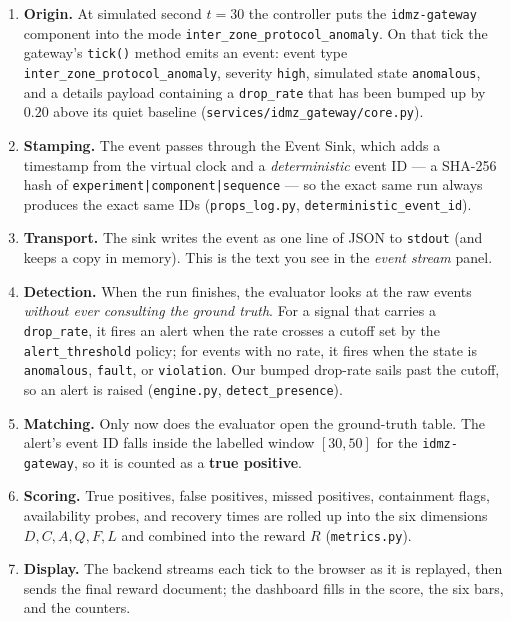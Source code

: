 \documentclass[11pt]{article}
\newcommand{\code}[1]{\texttt{\small #1}}
\newcommand{\file}[1]{\textcolor{mfpurple}{\texttt{\small #1}}}
\begin{document}
\begin{enumerate}[leftmargin=1.5em]
  \item \textbf{Origin.} At simulated second $t=30$ the controller puts the
        \code{idmz-gateway} component into the mode
        \code{inter\_zone\_protocol\_anomaly}. On that tick the gateway's
        \code{tick()} method emits an event: event type
        \code{inter\_zone\_protocol\_anomaly}, severity \code{high}, simulated
        state \code{anomalous}, and a details payload containing a
        \code{drop\_rate} that has been bumped up by $0.20$ above its quiet
        baseline (\file{services/idmz\_gateway/core.py}).
  \item \textbf{Stamping.} The event passes through the Event Sink, which adds a
        timestamp from the virtual clock and a \emph{deterministic} event ID ---
        a SHA-256 hash of \code{experiment|component|sequence} --- so the exact
        same run always produces the exact same IDs
        (\file{props\_log.py}, \code{deterministic\_event\_id}).
  \item \textbf{Transport.} The sink writes the event as one line of JSON to
        \code{stdout} (and keeps a copy in memory). This is the text you see in
        the \emph{event stream} panel.
  \item \textbf{Detection.} When the run finishes, the evaluator looks at the
        raw events \emph{without ever consulting the ground truth}. For a signal
        that carries a \code{drop\_rate}, it fires an alert when the rate crosses
        a cutoff set by the \code{alert\_threshold} policy; for events with no
        rate, it fires when the state is \code{anomalous}, \code{fault}, or
        \code{violation}. Our bumped drop-rate sails past the cutoff, so an alert
        is raised (\file{engine.py}, \code{detect\_presence}).
  \item \textbf{Matching.} Only now does the evaluator open the ground-truth
        table. The alert's event ID falls inside the labelled window
        $[30,50]$ for the \code{idmz-gateway}, so it is counted as a
        \textbf{true positive}.
  \item \textbf{Scoring.} True positives, false positives, missed positives,
        containment flags, availability probes, and recovery times are rolled up
        into the six dimensions $D, C, A, Q, F, L$ and combined into the reward
        $R$ (\file{metrics.py}).
  \item \textbf{Display.} The backend streams each tick to the browser as it is
        replayed, then sends the final reward document; the dashboard fills in
        the score, the six bars, and the counters.
\end{enumerate}
\end{document}
